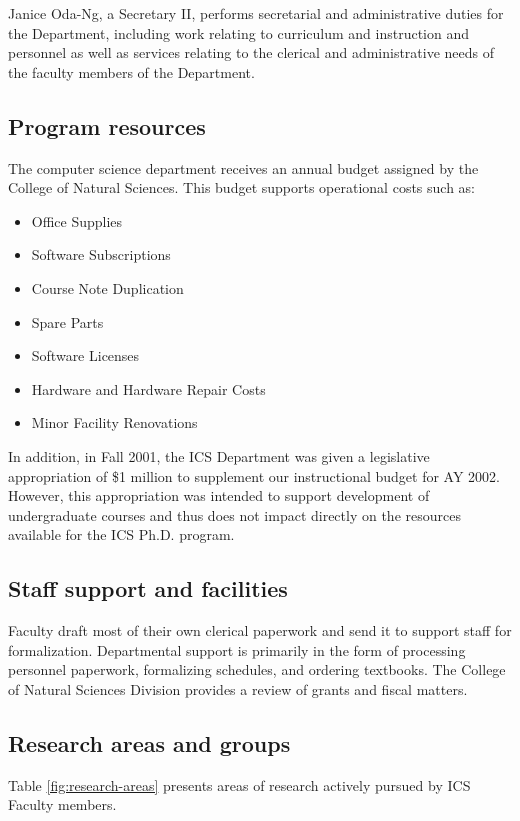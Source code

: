 \documentclass[12pt]{article}
\begin{document}
Janice Oda-Ng, a Secretary II, performs secretarial and administrative
duties for the Department, including work relating to curriculum and
instruction and personnel as well as services relating to the clerical and
administrative needs of the faculty members of the Department.

\subsection{Program resources}

The computer science department receives an annual budget assigned by the
College of Natural Sciences. This budget supports operational costs such
as:
\begin{itemize}
\item Office Supplies
\item Software Subscriptions
\item Course Note Duplication
\item Spare Parts
\item Software Licenses
\item Hardware and Hardware Repair Costs
\item Minor Facility Renovations
\end{itemize}

In addition, in Fall 2001, the ICS Department was given a legislative
appropriation of \$1 million to supplement our instructional budget for AY
2002. However, this appropriation was intended to support development of
undergraduate courses and thus does not impact directly on the resources
available for the ICS Ph.D. program. 

\subsection{Staff support and facilities}

Faculty draft most of their own clerical paperwork and send it to support
staff for formalization. Departmental support is primarily in the form of
processing personnel paperwork, formalizing schedules, and ordering
textbooks. The College of Natural Sciences Division provides a review of
grants and fiscal matters. 

\subsection{Research areas and groups}

Table \ref{fig:research-areas} presents areas of research actively pursued
by ICS Faculty members. 
\end{document}
